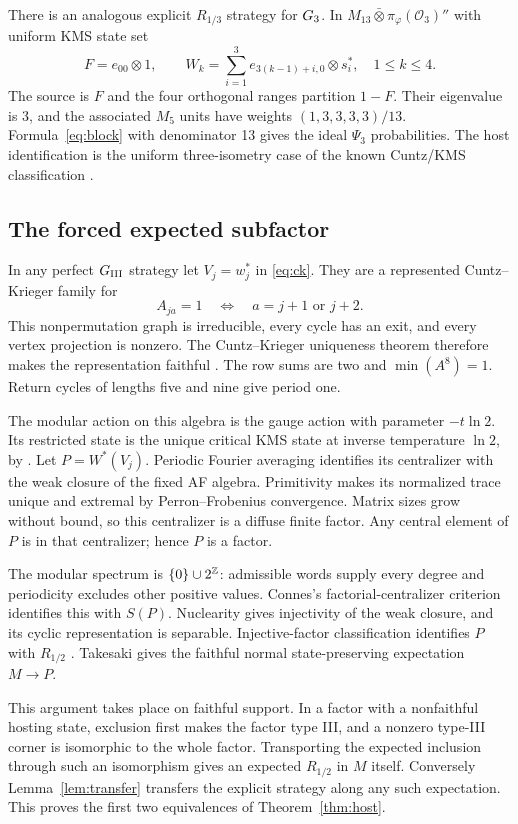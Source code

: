 There is an analogous explicit $R_{1/3}$ strategy for $G_3$. In $M_{13}\bar\otimes\pi_\varphi(\mathcal O_3)''$ with uniform KMS state set
\[
 F=e_{00}\otimes1,\qquad W_k=\sum_{i=1}^3e_{3(k-1)+i,0}\otimes s_i^*,\quad 1\le k\le4.
\]
The source is $F$ and the four orthogonal ranges partition $1-F$. Their eigenvalue is $3$, and the associated $M_5$ units have weights $(1,3,3,3,3)/13$. Formula~\eqref{eq:block} with denominator 13 gives the ideal $\Psi_3$ probabilities. The host identification is the uniform three-isometry case of the known Cuntz/KMS classification \cite[Theorem 4.9 and Example 4.13]{Harris}.

\subsection{The forced expected subfactor}
In any perfect $G_{\mathrm{III}}$ strategy let $V_j=w_j^*$ in \eqref{eq:ck}. They are a represented Cuntz--Krieger family for
\[
 A_{ja}=1\quad\Longleftrightarrow\quad a=j+1\text{ or }j+2.
\]
This nonpermutation graph is irreducible, every cycle has an exit, and every vertex projection is nonzero. The Cuntz--Krieger uniqueness theorem therefore makes the representation faithful \cite{CK}. The row sums are two and $\min(A^8)=1$. Return cycles of lengths five and nine give period one.

The modular action on this algebra is the gauge action with parameter $-t\ln2$. Its restricted state is the unique critical KMS state at inverse temperature $\ln2$, by \cite[Theorem 4.3]{Graph}. Let $P=W^*(V_j)$. Periodic Fourier averaging identifies its centralizer with the weak closure of the fixed AF algebra. Primitivity makes its normalized trace unique and extremal by Perron--Frobenius convergence. Matrix sizes grow without bound, so this centralizer is a diffuse finite factor. Any central element of $P$ is in that centralizer; hence $P$ is a factor.

The modular spectrum is $\{0\}\cup2^\mathbb Z$: admissible words supply every degree and periodicity excludes other positive values. Connes's factorial-centralizer criterion \cite[Corollary 3.2.7(a)]{Connes} identifies this with $S(P)$. Nuclearity gives injectivity of the weak closure, and its cyclic representation is separable. Injective-factor classification identifies $P$ with $R_{1/2}$ \cite{Connes76}. Takesaki gives the faithful normal state-preserving expectation $M\to P$.

This argument takes place on faithful support. In a factor with a nonfaithful hosting state, exclusion first makes the factor type III, and a nonzero type-III corner is isomorphic to the whole factor. Transporting the expected inclusion through such an isomorphism gives an expected $R_{1/2}$ in $M$ itself. Conversely Lemma~\ref{lem:transfer} transfers the explicit strategy along any such expectation. This proves the first two equivalences of Theorem~\ref{thm:host}.

